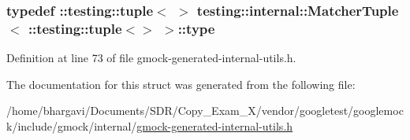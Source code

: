 \subsubsection[{\texorpdfstring{type}{type}}]{\setlength{\rightskip}{0pt plus 5cm}typedef \+::testing\+::tuple$<$ $>$ {\bf testing\+::internal\+::\+Matcher\+Tuple}$<$ \+::testing\+::tuple$<$$>$ $>$\+::{\bf type}}\hypertarget{structtesting_1_1internal_1_1_matcher_tuple_3_01_1_1testing_1_1tuple_3_4_01_4_a8d4493b2b299322e6c885dee5473ebd7}{}\label{structtesting_1_1internal_1_1_matcher_tuple_3_01_1_1testing_1_1tuple_3_4_01_4_a8d4493b2b299322e6c885dee5473ebd7}


Definition at line 73 of file gmock-\/generated-\/internal-\/utils.\+h.



The documentation for this struct was generated from the following file\+:\begin{DoxyCompactItemize}
\item 
/home/bhargavi/\+Documents/\+S\+D\+R/\+Copy\+\_\+\+Exam\+\_\+X/vendor/googletest/googlemock/include/gmock/internal/\hyperlink{gmock-generated-internal-utils_8h}{gmock-\/generated-\/internal-\/utils.\+h}\end{DoxyCompactItemize}
